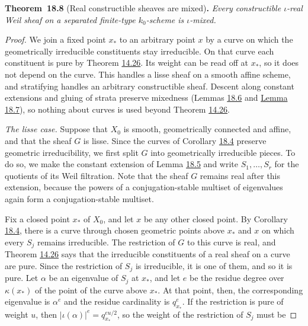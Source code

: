 \documentclass[11pt]{article}
\newenvironment{bpstatement}[2]{\par\addvspace{0.6\baselineskip}\noindent\textbf{#1}#2\textbf{.}\enspace\ignorespaces}
  {\par\addvspace{0.4\baselineskip}}
\newenvironment{bpstatementit}[2]{\begin{bpstatement}{#1}{#2}\itshape\ignorespaces}{\end{bpstatement}}
\begin{document}
\label{bp295}%
\begin{bpstatementit}{Theorem~18.8}{ (Real constructible sheaves are mixed)}
Every constructible \(\iota\)-real Weil sheaf on a separated finite-type \(k_0\)-scheme is \(\iota\)-mixed.
\end{bpstatementit}

\begin{proof}[{Proof}]\label{bp296}%
We join a fixed point \(x_*\) to an arbitrary point \(x\) by a curve on which the geometrically irreducible constituents stay irreducible. On that curve each constituent is pure by Theorem \hyperref[bp120]{14.26}. Its weight can be read off at \(x_*\), so it does not depend on the curve. This handles a lisse sheaf on a smooth affine scheme, and stratifying handles an arbitrary constructible sheaf. Descent along constant extensions and gluing of strata preserve mixedness (Lemmas \hyperref[bp291]{18.6} and \hyperref[bp293]{Lemma 18.7}), so nothing about curves is used beyond Theorem \hyperref[bp120]{14.26}.

\emph{The lisse case.} Suppose that \(X_0\) is smooth, geometrically connected and affine, and that the sheaf \(G\) is lisse. Since the curves of Corollary \hyperref[bp284]{18.4} preserve geometric irreducibility, we first split \(G\) into geometrically irreducible pieces. To do so, we make the constant extension of Lemma \hyperref[bp288]{18.5} and write \(S_1,\ldots,S_r\) for the quotients of its Weil filtration. Note that the sheaf \(G\) remains real after this extension, because the powers of a conjugation-stable multiset of eigenvalues again form a conjugation-stable multiset.

Fix a closed point \(x_*\) of \(X_0\), and let \(x\) be any other closed point. By Corollary \hyperref[bp284]{18.4}, there is a curve through chosen geometric points above \(x_*\) and \(x\) on which every \(S_j\) remains irreducible. The restriction of \(G\) to this curve is real, and Theorem \hyperref[bp120]{14.26} says that the irreducible constituents of a real sheaf on a curve are pure. Since the restriction of \(S_j\) is irreducible, it is one of them, and so it is pure. Let \(\alpha\) be an eigenvalue of \(S_j\) at \(x_*\), and let \(e\) be the residue degree over \(\kappa(x_*)\) of the point of the curve above \(x_*\). At that point, then, the corresponding eigenvalue is \(\alpha^e\) and the residue cardinality is \(q_{x_*}^e\). If the restriction is pure of weight \(u\), then \(|\iota(\alpha)|^e=q_{x_*}^{eu/2}\), so the weight of the restriction of \(S_j\) must be


\end{proof}
\end{document}

